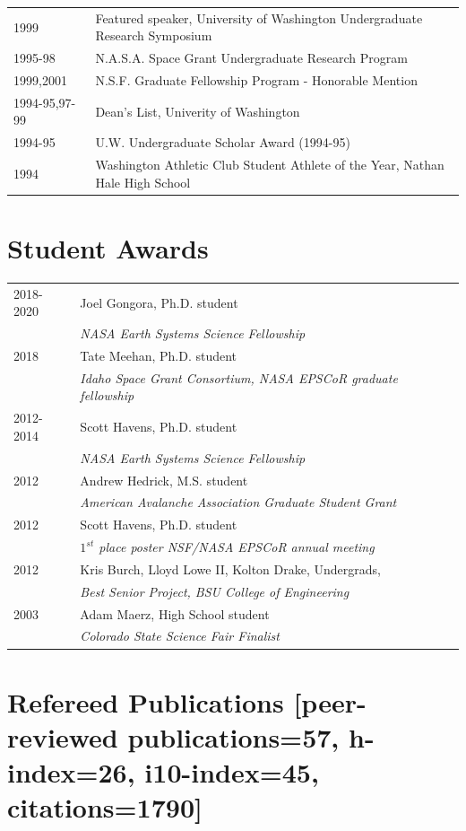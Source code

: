 \documentclass[11pt]{article}
\begin{document}
\begin{tabular}{ll}
1999 & Featured speaker, University of Washington Undergraduate Research Symposium \\
1995-98 & N.A.S.A. Space Grant Undergraduate Research Program \\
1999,2001 & N.S.F. Graduate Fellowship Program - Honorable Mention \\
1994-95,97-99 & Dean's List, Univerity of Washington \\
1994-95 & U.W. Undergraduate Scholar Award (1994-95) \\
1994 & Washington Athletic Club Student Athlete of the Year, Nathan Hale High School \\
\end{tabular}

\section*{Student Awards}
\begin{tabular}{ll}
2018-2020 & Joel Gongora, Ph.D. student \\
& \textit{NASA Earth Systems Science Fellowship} \\
2018 & Tate Meehan, Ph.D. student \\
& \textit{Idaho Space Grant Consortium, NASA EPSCoR graduate fellowship} \\
2012-2014 & Scott Havens, Ph.D. student \\
& \textit{NASA Earth Systems Science Fellowship} \\
2012 & Andrew Hedrick, M.S. student \\
& \textit{American Avalanche Association Graduate Student Grant} \\
2012 & Scott Havens, Ph.D. student \\
& \textit{$1^{st}$ place poster NSF/NASA EPSCoR annual meeting} \\
2012 & Kris Burch, Lloyd Lowe II, Kolton Drake, Undergrads, \\ 
& \textit{Best Senior Project, BSU College of Engineering} \\
2003 & Adam Maerz, High School student \\
& \textit{Colorado State Science Fair Finalist}
\end{tabular}

\pagebreak

\section*{Refereed Publications \small{[peer-reviewed publications=57, h-index=26, i10-index=45, citations=1790]}}
\setlength{\extrarowheight}{10pt}
\end{document}
